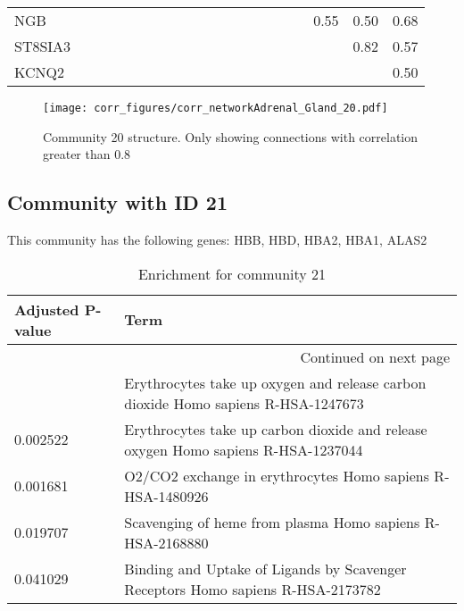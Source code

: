 \begin{longtable}{lrrrrrrrrrrrrrrrrrrr}
NGB     &             &              &             &            &             &           &            &            &              &          &            &             &              &               &              &           &          0.55 &        0.50 &           0.68 \\
ST8SIA3 &             &              &             &            &             &           &            &            &              &          &            &             &              &               &              &           &               &        0.82 &           0.57 \\
KCNQ2   &             &              &             &            &             &           &            &            &              &          &            &             &              &               &              &           &               &             &           0.50 \\
\end{longtable}


\begin{figure}[h!]
\centering
\texttt{[image: corr\_figures/corr\_networkAdrenal\_Gland\_20.pdf]}
\caption{Community 20 structure. Only showing connections with correlation greater than 0.8}
\end{figure}




\subsection*{Community with ID 21}
This community has the following genes: HBB, HBD, HBA2, HBA1, ALAS2
\\
\begin{longtable}{p{2.4cm}p{14.5cm}}
\caption{Enrichment for community 21}\\
\toprule
Adjusted \newline P-value &                                                                               Term \\
\midrule
\endhead
\midrule
\multicolumn{2}{r}{{Continued on next page}} \\
\midrule
\endfoot

\bottomrule
\endlastfoot
                 0.002141 &  Erythrocytes take up oxygen and release carbon dioxide Homo sapiens R-HSA-1247673 \\
                 0.002522 &  Erythrocytes take up carbon dioxide and release oxygen Homo sapiens R-HSA-1237044 \\
                 0.001681 &                         O2/CO2 exchange in erythrocytes Homo sapiens R-HSA-1480926 \\
                 0.019707 &                          Scavenging of heme from plasma Homo sapiens R-HSA-2168880 \\
                 0.041029 &    Binding and Uptake of Ligands by Scavenger Receptors Homo sapiens R-HSA-2173782 \\
\end{longtable}



